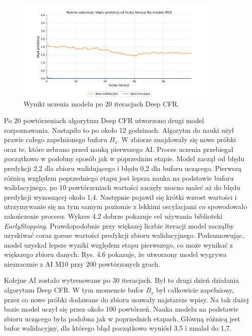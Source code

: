 \documentclass[12pt,oneside,a4paper]{report}
\begin{document}
\begin{figure}[!ht]
  \centering
  \includegraphics[width=0.9\textwidth]{./img/model2.pdf}
\caption{Wyniki uczenia modelu po 20 iteracjach Deep CFR.}
\end{figure}


\newpage
Po 20 powtórzeniach algorytmu Deep CFR utworzono drugi model rozpoznawania. 
Nastapiło to po około 12 godzinach. Algorytm do nauki użył prawie całego zapełnionego buforu $B_{s}$.
W zbiorze znajdowały się nowe próbki oraz te, które zebrano przed nauką pierwszego AI.
Proces uczenia przebiegał początkowo w podobny sposób jak w poprzednim etapie. Model zaczął od błędu
predykcji 2,2 dla zbioru walidującego i błędu 0,2 dla buforu uczącego. Pierwszą różnicą względem 
poprzedniego etapu jest lepsza nauka na podstawie buforu walidacyjnego, po 10
powtórzeniach wartości zaczęły mocno
maleć aż do błędu predykcji wynoszącej około 1,4. Następnie pojawił się krótki wzrost wartości i
utrzymywanie się
na tym samym poziomie z lekkimi oscylacjami co spowodowało 
zakończenie procesu. Wykres 4.2 dobrze pokazuje cel używania biblioteki \emph{EarlyStopping}.
Prawdopodobnie przy większej liczbie iteracji model zacząłby uzyskiwać coraz gorsze wartości
predykcji zbioru walidacyjnego. Podsumowując, model uzyskał lepsze wyniki względem etapu pierwszego,
co może wynikać z większego zbioru danych. Rys. 4.6 pokazuje, że utworzony
model wygrywa nieznacznie z AI M10 przy 200 powtórzonych grach.

Kolejne AI zostało wytrenowane po 30 iteracjach. Był to drugi dzień działania algorytmu
Deep
CFR. W tym momencie bufor $B_{s}$ był całkowicie zapełniony, przez co
nowe próbki dodawane do zbioru usuwały najstarsze wpisy. Na tak dużej bazie model uczył się 
przez około 100
powtórzeń. Nauka modelu na podstawie zbioru uczącego była podobna jak w poprzednich etapach. Główną
różnicą jest bufor walidacyjny, dla którego błąd początkowo wyniósł 3,5 i zmalał do 1,7. 
\end{document}
